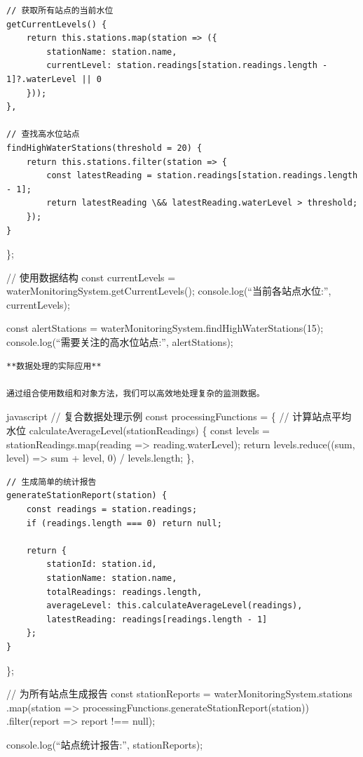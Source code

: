 {\begin{verbatim}
// 获取所有站点的当前水位
getCurrentLevels() {
    return this.stations.map(station => ({
        stationName: station.name,
        currentLevel: station.readings[station.readings.length - 1]?.waterLevel || 0
    }));
},

// 查找高水位站点
findHighWaterStations(threshold = 20) {
    return this.stations.filter(station => {
        const latestReading = station.readings[station.readings.length - 1];
        return latestReading \&& latestReading.waterLevel > threshold;
    });
}
\end{verbatim}

\};

// 使用数据结构 const currentLevels = waterMonitoringSystem.getCurrentLevels(); console.log(``当前各站点水位:'', currentLevels);

const alertStations = waterMonitoringSystem.findHighWaterStations(15); console.log(``需要关注的高水位站点:'', alertStations);

\begin{lstlisting}
**数据处理的实际应用**

通过组合使用数组和对象方法，我们可以高效地处理复杂的监测数据。
\end{lstlisting}

javascript // 复合数据处理示例 const processingFunctions = \{ // 计算站点平均水位 calculateAverageLevel(stationReadings) \{ const levels = stationReadings.map(reading =\textgreater{} reading.waterLevel); return levels.reduce((sum, level) =\textgreater{} sum + level, 0) / levels.length; \},

\begin{verbatim}
// 生成简单的统计报告
generateStationReport(station) {
    const readings = station.readings;
    if (readings.length === 0) return null;
    
    return {
        stationId: station.id,
        stationName: station.name,
        totalReadings: readings.length,
        averageLevel: this.calculateAverageLevel(readings),
        latestReading: readings[readings.length - 1]
    };
}
\end{verbatim}

\};

// 为所有站点生成报告 const stationReports = waterMonitoringSystem.stations .map(station =\textgreater{} processingFunctions.generateStationReport(station)) .filter(report =\textgreater{} report !== null);

console.log(``站点统计报告:'', stationReports);

}
